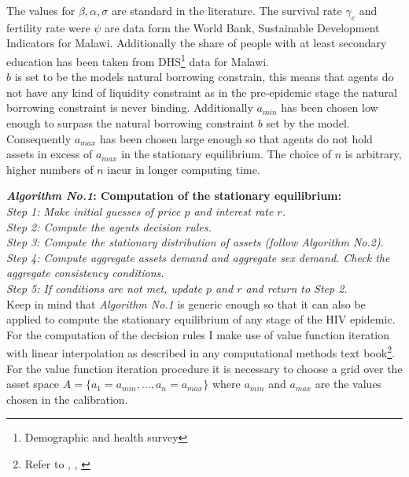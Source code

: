 The values for $\beta, \alpha, \sigma$ are standard in the literature. The survival rate $\gamma_{e}$ and fertility rate were $\psi$ are data form the World Bank, Sustainable Development Indicators for Malawi. Additionally the share of people with at least secondary education has been taken from DHS\footnote{Demographic and health survey} data for Malawi.\\

$b$ is set to be the models natural borrowing constrain, this means that agents do not have any kind of liquidity constraint as in the pre-epidemic stage the natural borrowing constraint is never binding. Additionally $a_{min}$ has been chosen low enough to surpass the natural borrowing constraint $b$ set by the model. Consequently $a_{max}$ has been chosen large enough so that agents do not hold assets in excess of $a_{max}$ in the stationary equilibrium. The choice of $n$ is arbitrary, higher numbers of $n$ incur in longer computing time.

\noindent \textbf{\textit{Algorithm No.1}: Computation of the stationary equilibrium:}\\

\noindent\textit{Step 1: Make initial guesses of price $p$ and interest rate $r$.\\
Step 2: Compute the agents decision rules.\\
Step 3: Compute the stationary distribution of assets (follow Algorithm No.2).\\
Step 4: Compute aggregate assets demand and aggregate sex demand. Check the aggregate consistency conditions.\\
Step 5: If conditions are not met, update $p$ and $r$ and return to Step 2.
}\\

Keep in mind that \textit{Algorithm No.1} is generic enough so that it can also be applied to compute the stationary equilibrium of any stage of the HIV epidemic.\\

For the computation of the decision rules I make use of value function iteration with linear interpolation as described in any computational methods text book\footnote{Refer to \cite{mauss}, \cite{judd}, \cite{sargent}}. For the value function iteration procedure it is necessary to choose a grid over the asset space $A=\{a_{1}=a_{min},...,a_{n}=a_{max}\}$ where $a_{min}$ and $a_{max}$ are the values chosen in the calibration. \\

